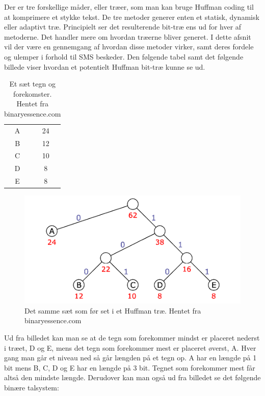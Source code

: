Der er tre forskellige måder, eller træer, som man kan bruge Huffman coding til at komprimere et stykke tekst. De tre metoder generer enten et statisk, dynamisk eller adaptivt træ. Principielt ser det resulterende bit-træ ens ud for hver af metoderne. Det handler mere om hvordan træerne bliver generet. I dette afsnit vil der være en gennemgang af hvordan disse metoder virker, samt deres fordele og ulemper i forhold til SMS beskeder. Den følgende tabel samt det følgende billede viser hvordan et potentielt Huffman bit-træ kunne se ud.

\begin{table}[H]
\begin{center}
\begin{tabular}{|c|c|}
    \hline
    \cellcolor{ForestGreen}\color{white}{\textbf{Tegn}}& \cellcolor{ForestGreen}\color{white}{\textbf{Forekomster}}\\[2ex] \hline
    A & 24 \\ \hline
    B & 12 \\ \hline
    C & 10 \\ \hline
    D & 8 \\ \hline
    E & 8 \\ \hline
\end{tabular} 
\caption{Et sæt tegn og forekomster. Hentet fra binaryessence.com}
\end{center}
\end{table}

\begin{figure}[H]
\centering
\includegraphics[width=\linewidth]{Billeder/huffman_tree.png}
\caption{Det samme sæt som før set i et Huffman træ. Hentet fra binaryessence.com}
\label{fig:huffmantree_fred}
\end{figure}

Ud fra billedet kan man se at de tegn som forekommer mindst er placeret nederst i træet, D og E, mens det tegn som forekommer mest er placeret øverst, A. Hver gang man går et niveau ned så går længden på et tegn op. A har en længde på 1 bit mens B, C, D og E har en længde på 3 bit. Tegnet som forekommer mest får altså den mindste længde. Derudover kan man også ud fra billedet se det følgende binære talsystem:

